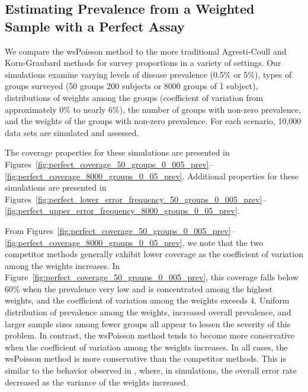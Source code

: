 \documentclass[AMA,STIX1COL]{WileyNJD-v2}
\begin{document}
\subsection{Estimating Prevalence from a Weighted Sample with a Perfect Assay}

We compare the wsPoisson method to the more traditional Agresti-Coull and Korn-Graubard methods for survey proportions in a variety of settings.
Our simulations examine varying levels of disease prevalence (0.5\% or 5\%), types of groups surveyed (50 groups 200 subjects or 8000 groups of 1 subject), distributions of weights among the groups (coefficient of variation from approximately 0\% to nearly 6\%), the number of groups with non-zero prevalence, and the weights of the groups with non-zero prevalence.
For each scenario, 10,000 data sets are simulated and assessed.


The coverage properties for these simulations are presented in Figures~\ref{fig:perfect_coverage_50_groups_0_005_prev}--\ref{fig:perfect_coverage_8000_groups_0_05_prev}.
Additional properties for these simulations are presented in Figures~\ref{fig:perfect_lower_error_frequency_50_groups_0_005_prev}--\ref{fig:perfect_upper_error_frequency_8000_groups_0_05_prev}.

From Figures~\ref{fig:perfect_coverage_50_groups_0_005_prev}--\ref{fig:perfect_coverage_8000_groups_0_05_prev}, we note that the two competitor methods generally exhibit lower coverage as the coefficient of variation among the weights increases.
In Figure~\ref{fig:perfect_coverage_50_groups_0_005_prev}, this coverage falls below 60\% when the prevalence very low and is concentrated among the highest weights, and the coefficient of variation among the weights exceeds 4.
Uniform distribution of prevalence among the weights, increased overall prevalence, and larger sample sizes among fewer groups all appear to lessen the severity of this problem.
In contrast, the wsPoisson method tends to become more conservative when the coefficient of variation among the weights increases.
In all cases, the wsPoisson method is more conservative than the competitor methods.
This is similar to the behavior observed in \cite{FayF:1997}, where, in simulations, the overall error rate decreased as the variance of the weights increased.
\end{document}

